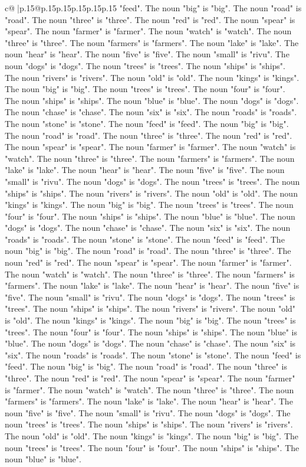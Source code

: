 \documentclass{article}
\begin{document}
{\begin{supertabular}{c@{$\;$}|p{.15\linewidth}@{}p{.15\linewidth}p{.15\linewidth}p{.15\linewidth}p{.15\linewidth}p{.15\linewidth}}
{{{"feed". The noun "big" is "big". The noun "road" is "road". The noun "three" is "three". The noun "red" is "red". The noun "spear" is "spear". The noun "farmer" is "farmer". The noun "watch" is "watch". The noun "three" is "three". The noun "farmers" is "farmers". The noun "lake" is "lake". The noun "hear" is "hear". The noun "five" is "five". The noun "small" is "rivu". The noun "dogs" is "dogs". The noun "trees" is "trees". The noun "ships" is "ships". The noun "rivers" is "rivers". The noun "old" is "old". The noun "kings" is "kings". The noun "big" is "big". The noun "trees" is "trees". The noun "four" is "four". The noun "ships" is "ships". The noun "blue" is "blue". The noun "dogs" is "dogs". The noun "chase" is "chase". The noun "six" is "six". The noun "roads" is "roads". The noun "stone" is "stone". The noun "feed" is "feed". The noun "big" is "big". The noun "road" is "road". The noun "three" is "three". The noun "red" is "red". The noun "spear" is "spear". The noun "farmer" is "farmer". The noun "watch" is "watch". The noun "three" is "three". The noun "farmers" is "farmers". The noun "lake" is "lake". The noun "hear" is "hear". The noun "five" is "five". The noun "small" is "rivu". The noun "dogs" is "dogs". The noun "trees" is "trees". The noun "ships" is "ships". The noun "rivers" is "rivers". The noun "old" is "old". The noun "kings" is "kings". The noun "big" is "big". The noun "trees" is "trees". The noun "four" is "four". The noun "ships" is "ships". The noun "blue" is "blue". The noun "dogs" is "dogs". The noun "chase" is "chase". The noun "six" is "six". The noun "roads" is "roads". The noun "stone" is "stone". The noun "feed" is "feed". The noun "big" is "big". The noun "road" is "road". The noun "three" is "three". The noun "red" is "red". The noun "spear" is "spear". The noun "farmer" is "farmer". The noun "watch" is "watch". The noun "three" is "three". The noun "farmers" is "farmers". The noun "lake" is "lake". The noun "hear" is "hear". The noun "five" is "five". The noun "small" is "rivu". The noun "dogs" is "dogs". The noun "trees" is "trees". The noun "ships" is "ships". The noun "rivers" is "rivers". The noun "old" is "old". The noun "kings" is "kings". The noun "big" is "big". The noun "trees" is "trees". The noun "four" is "four". The noun "ships" is "ships". The noun "blue" is "blue". The noun "dogs" is "dogs". The noun "chase" is "chase". The noun "six" is "six". The noun "roads" is "roads". The noun "stone" is "stone". The noun "feed" is "feed". The noun "big" is "big". The noun "road" is "road". The noun "three" is "three". The noun "red" is "red". The noun "spear" is "spear". The noun "farmer" is "farmer". The noun "watch" is "watch". The noun "three" is "three". The noun "farmers" is "farmers". The noun "lake" is "lake". The noun "hear" is "hear". The noun "five" is "five". The noun "small" is "rivu". The noun "dogs" is "dogs". The noun "trees" is "trees". The noun "ships" is "ships". The noun "rivers" is "rivers". The noun "old" is "old". The noun "kings" is "kings". The noun "big" is "big". The noun "trees" is "trees". The noun "four" is "four". The noun "ships" is "ships". The noun "blue" is "blue". }}}
\end{supertabular}}
\end{document}
